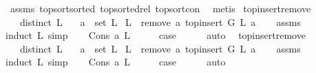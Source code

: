 \begin{isabellebody}
\ assms\ top{\isacharunderscore}{\kern0pt}sort{\isacharunderscore}{\kern0pt}sorted\ top{\isacharunderscore}{\kern0pt}sorted{\isacharunderscore}{\kern0pt}rel{}\ top{\isacharunderscore}{\kern0pt}sort{\isacharunderscore}{\kern0pt}con\ \isamarkupfalse%
\ metis%
\endisatagproof
{\isafoldproof}%
%
\isadelimproof
\isanewline
%
\endisadelimproof
\isanewline
{}\isamarkupfalse%
\ top{\isacharunderscore}{\kern0pt}insert{\isacharunderscore}{\kern0pt}remove{\isacharcolon}{\kern0pt}\isanewline
\ \ \ {\isachardoublequoteopen}distinct\ L{\isachardoublequoteclose}\isanewline
\ \ \ {\isachardoublequoteopen}a\ {\isasymnotin}\ set\ L{\isachardoublequoteclose}\isanewline
{}\ {\isachardoublequoteopen}L\ {\isacharequal}{\kern0pt}\ remove{}\ a\ {\isacharparenleft}{\kern0pt}top{\isacharunderscore}{\kern0pt}insert\ G\ L\ a{\isacharparenright}{\kern0pt}{\isachardoublequoteclose}\isanewline
%
\isadelimproof
\ \ %
\endisadelimproof
%
\isatagproof
{}\isamarkupfalse%
\ assms\ \isanewline
{}\isamarkupfalse%
{\isacharparenleft}{\kern0pt}induct\ L{\isacharcomma}{\kern0pt}\ simp{\isacharparenright}{\kern0pt}\isanewline
\ \ \isamarkupfalse%
\ {\isacharparenleft}{\kern0pt}Cons\ a\ L{\isacharparenright}{\kern0pt}\isanewline
\ \ \isamarkupfalse%
\ \isamarkupfalse%
\ {\isacharquery}{\kern0pt}case\isanewline
\ \ \ \ \isamarkupfalse%
\ auto\ \isanewline
{}\isamarkupfalse%
%
\endisatagproof
{\isafoldproof}%
%
\isadelimproof
\isanewline
%
\endisadelimproof
\isanewline
\isanewline
{}\isamarkupfalse%
\ top{\isacharunderscore}{\kern0pt}insert{\isacharunderscore}{\kern0pt}remove{}{\isacharcolon}{\kern0pt}\isanewline
\ \ \ {\isachardoublequoteopen}distinct\ L{\isachardoublequoteclose}\isanewline
\ \ \ {\isachardoublequoteopen}a\ {\isasymnotin}\ set\ L{\isachardoublequoteclose}\isanewline
{}\ {\isachardoublequoteopen}L\ {\isacharequal}{\kern0pt}\ remove{}\ a\ {\isacharparenleft}{\kern0pt}top{\isacharunderscore}{\kern0pt}insert\ G\ L\ a{\isacharparenright}{\kern0pt}{\isachardoublequoteclose}\isanewline
%
\isadelimproof
\ \ %
\endisadelimproof
%
\isatagproof
{}\isamarkupfalse%
\ assms\ \isanewline
{}\isamarkupfalse%
{\isacharparenleft}{\kern0pt}induct\ L{\isacharcomma}{\kern0pt}\ simp{\isacharparenright}{\kern0pt}\isanewline
\ \ \isamarkupfalse%
\ {\isacharparenleft}{\kern0pt}Cons\ a\ L{\isacharparenright}{\kern0pt}\isanewline
\ \ \isamarkupfalse%
\ \isamarkupfalse%
\ {\isacharquery}{\kern0pt}case\isanewline
\ \ \ \ \isamarkupfalse%
\ auto\ \isanewline
{}\isamarkupfalse%
%
\endisatagproof
{\isafoldproof}%
%
\isadelimproof
\isanewline
%
\endisadelimproof
%
\isadelimtheory
\isanewline
%
\endisadelimtheory
%
\isatagtheory
{}\isamarkupfalse%
%
\endisatagtheory
{\isafoldtheory}%
%
\isadelimtheory
%
\endisadelimtheory
%
\end{isabellebody}%
